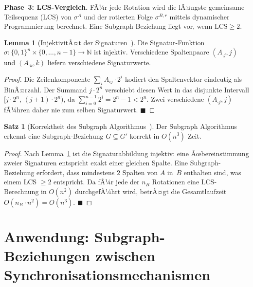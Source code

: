 ﻿\documentclass[a4paper,12pt]{article}
\theoremstyle{definition}
\newtheorem{satz}{Satz}
\newtheorem{lemma}{Lemma}
\begin{document}
\textbf{Phase~3: LCS-Vergleich.}
FÃ¼r jede Rotation wird die lÃ¤ngste gemeinsame Teilsequenz (LCS) von
$\sigma^A$ und der rotierten Folge $\sigma^{B,r}$ mittels dynamischer
Programmierung berechnet. Eine Subgraph-Beziehung liegt vor, wenn
$\mathrm{LCS} \geq 2$.

\begin{lemma}[InjektivitÃ¤t der Signaturen~\cite{epp2026subgraph}]
  \label{lem:inj}
  Die Signatur-Funktion $\sigma: \{0,1\}^n \times \{0,\ldots,n-1\} \to \mathbb{N}$
  ist injektiv. Verschiedene Spaltenpaare $(A_{\cdot j}, j)$ und
  $(A_{\cdot k}, k)$ liefern verschiedene Signaturwerte.
\end{lemma}

\begin{proof}
  Die Zeilenkomponente $\sum_{i} A_{ij} \cdot 2^i$ kodiert den Spaltenvektor
  eindeutig als BinÃ¤rzahl. Der Summand $j \cdot 2^n$ verschiebt diesen Wert
  in das disjunkte Intervall $[j \cdot 2^n,\, (j+1) \cdot 2^n)$, da
  $\sum_{i=0}^{n-1} 2^i = 2^n - 1 < 2^n$. Zwei verschiedene
  $(A_{\cdot j}, j)$ fÃ¼hren daher nie zum selben Signaturwert.
  \hfill$\blacksquare$
\end{proof}

\begin{satz}[Korrektheit des Subgraph Algorithmus~\cite{epp2026subgraph}]
  \label{satz:korrektheit}
  Der Subgraph Algorithmus erkennt eine Subgraph-Beziehung $G \subseteq G'$
  korrekt in $O(n^3)$ Zeit.
\end{satz}

\begin{proof}
  Nach Lemma~\ref{lem:inj} ist die Signaturabbildung injektiv: eine
  Ãœbereinstimmung zweier Signaturen entspricht exakt einer gleichen Spalte.
  Eine Subgraph-Beziehung erfordert, dass mindestens $2$ Spalten von $A$
  in~$B$ enthalten sind, was einem LCS $\geq 2$ entspricht. Da fÃ¼r jede der
  $n_B$ Rotationen eine LCS-Berechnung in $O(n^2)$ durchgefÃ¼hrt wird,
  betrÃ¤gt die Gesamtlaufzeit $O(n_B \cdot n^2) = O(n^3)$.
  \hfill$\blacksquare$
\end{proof}

\section{Anwendung: Subgraph-Beziehungen zwischen Synchronisationsmechanismen}
\label{sec:anwendung}
\end{document}
